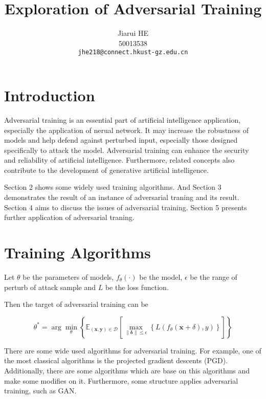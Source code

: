 \documentclass[10pt,twocolumn,letterpaper]{article}
\title{Exploration of Adversarial Training}
\author{Jiarui HE\\
50013538 \\
{\tt\small jhe218@connect.hkust-gz.edu.cn}
}
\begin{document}
\maketitle

\begin{abstract}
  
\end{abstract}

\section{Introduction}

Adversarial training is an essential part of artificial intelligence application, especially the application of nerual network. It may increase the robustness of models and help defend against perturbed input, especially those designed specifically to attack the model. Adversarial training can enhance the security and reliability of artificial intelligence. Furthermore, related concepts also contribute to the development of generative artificial intelligence.

Section 2 shows some widely used training algorithms. And Section 3 demonstrates the result of an instance of adversarial traning and its result. Section 4 aims to discuss the issues of adversarial training. Section 5 presents further application of adversarial traning.

\section{Training Algorithms}
Let $\theta$ be the parameters of models, $f_\theta(\cdot)$ be the model, $\epsilon$ be the range of perturb of attack sample and $L$ be the loss function.

Then the target of adversarial training can be

\begin{equation}
\theta^*=\arg\min_\theta\left\{
  \mathbb{E}_{(\mathbf{x}, \mathbf{y})\in \mathcal{D}}
  \left[
      \max_{\lVert\mathbf{\delta}\rVert\leq \epsilon}
          \left\{L(f_\theta(\mathbf{x}+\delta), y)\right\}
  \right]
\right\}
\tag{2:1}
\label{formula:adversarial_target}
\end{equation}

There are some wide used algorithms for adversarial training.
For example, one of the most classical algorithms is the projected gradient descents (PGD).
Additionally, there are some algorithms which are base on this algorithms and make some modifies on it.
Furthermore, some structure applies adversarial training, such as GAN.
\end{document}
